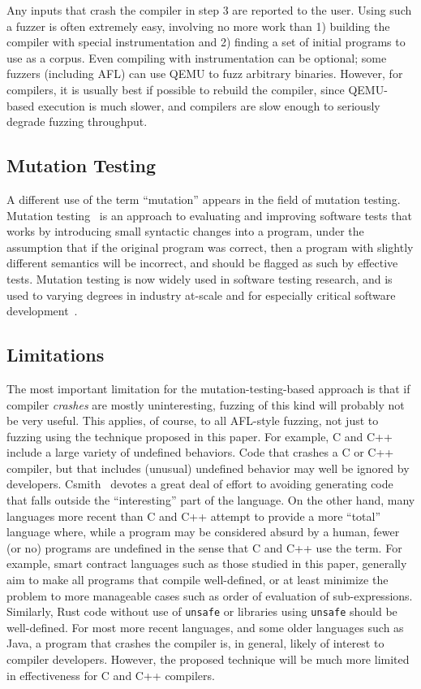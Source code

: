 Any inputs that crash the compiler in step 3 are reported to the user.  Using such a fuzzer is often extremely easy, involving no more work than 1) building the compiler with special instrumentation and 2) finding a set of initial programs to use as a corpus.  Even compiling with instrumentation can be optional; some fuzzers (including AFL) can use QEMU to fuzz arbitrary binaries.  However, for compilers, it is usually best if possible to rebuild the compiler, since QEMU-based execution is much slower, and compilers are slow enough to seriously degrade fuzzing throughput.

\subsection{Mutation Testing}

A different use of the term ``mutation'' appears in the field of mutation testing.  Mutation testing~\cite{MutationSurvey,budd1979mutation,demillo1978hints} is an approach to evaluating and improving software tests that works by introducing small syntactic changes into a program, under the assumption that if the original program was correct, then a program with slightly different semantics will be incorrect, and should be flagged as such by effective tests.  Mutation testing is now widely used in software testing research, and is used to varying degrees in industry at-scale and for especially critical software development~\cite{mutKernel,mutGoogle,mutFacebook}.

\subsection{Limitations}

The most important limitation for the mutation-testing-based approach is that if compiler \emph{crashes} are mostly uninteresting, fuzzing of this kind will probably not be very useful.  This applies, of course, to all AFL-style fuzzing, not just to fuzzing using the technique proposed in this paper.  For example, C and C++ include a large variety of undefined behaviors.  Code that crashes a C or C++ compiler, but that includes (unusual) undefined behavior may well be ignored by developers.  Csmith~\cite{csmith} devotes a great deal of effort to avoiding generating code that falls outside the ``interesting'' part of the language.  On the other hand, many languages more recent than C and C++ attempt to provide a more ``total'' language where, while a program may be considered absurd by a human, fewer (or no) programs are undefined in the sense that C and C++ use the term.  For example, smart contract languages such as those studied in this paper, generally aim to make all programs that compile well-defined, or at least minimize the problem to more manageable cases such as order of evaluation of sub-expressions.  Similarly, Rust code without use of {\tt unsafe} or libraries using {\tt unsafe} should be well-defined.  For most more recent languages, and some older languages such as Java, a program that crashes the compiler is, in general, likely of interest to compiler developers.  However, the proposed technique will be much more limited in effectiveness for C and C++ compilers.